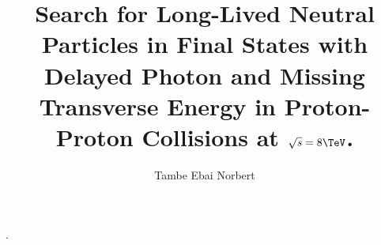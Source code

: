 \phd. %
\title{\bf Search for Long-Lived Neutral Particles in Final States with Delayed Photon and Missing Transverse Energy in Proton-Proton Collisions at $\sqrt{s} = 8\TeV$.}
\author{Tambe Ebai Norbert}


\copyrightpage %

\abstract{}

\acknowledgements{}
\dedication{}


\beforepreface 

\figurespage
\tablespage

\afterpreface            
